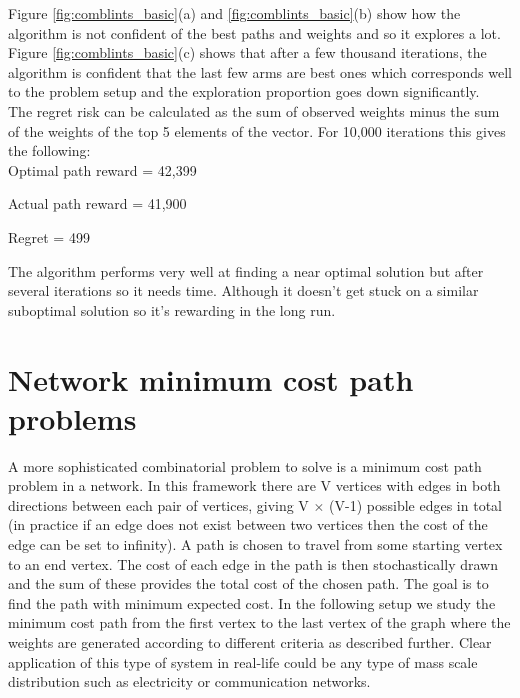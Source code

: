 \noindent Figure \ref{fig:comblints_basic}(a) and \ref{fig:comblints_basic}(b) show how the algorithm is not confident of the best paths and weights and so it explores a lot. Figure \ref{fig:comblints_basic}(c) shows that after a few thousand iterations, the algorithm is confident that the last few arms are best ones which corresponds well to the problem setup and the exploration proportion goes down significantly.\\

The regret risk can be calculated as the sum of observed weights minus the sum of the weights of the top 5 elements of the vector. For 10,000 iterations this gives the following:\\

Optimal path reward = 42,399

Actual path reward = 41,900

Regret = 499\

\noindent The algorithm performs very well at finding a near optimal solution but after several iterations so it needs time. Although it doesn't get stuck on a similar suboptimal solution so it's rewarding in the long run.\\

\pagebreak


\section{Network minimum cost path problems}

A more sophisticated combinatorial problem to solve is a minimum cost path problem in a network. In this framework there are V vertices with edges in both directions between each pair of vertices, giving V $\times$ (V-1) possible edges in total (in practice if an edge does not exist between two vertices then the cost of the edge can be set to infinity). A path is chosen to travel from some starting vertex to an end vertex. The cost of each edge in the path is then stochastically drawn and the sum of these provides the total cost of the chosen path. The goal is to find the path with minimum expected cost. In the following setup we study the minimum cost path from the first vertex to the last vertex of the graph where the weights are generated according to different criteria as described further. Clear application of this type of system in real-life could be any type of mass scale distribution such as electricity or communication networks.\\

